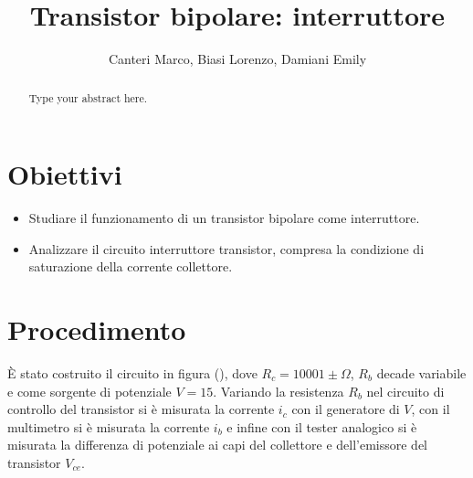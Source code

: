 \documentclass[letterpaper,11pt]{article}
\title{\textbf{Transistor bipolare:} interruttore}
\author{Canteri Marco, Biasi Lorenzo, Damiani Emily}
\date{}  %
\begin{document}
\maketitle

\begin{abstract}
Type your abstract here.
\end{abstract}

\begin{body}
\section{Obiettivi}
\begin{itemize}
\item Studiare il funzionamento di un transistor bipolare come interruttore.
\item Analizzare il circuito interruttore transistor, compresa la condizione di saturazione della
corrente collettore.
\end{itemize}
\section{Procedimento}
È stato costruito il circuito in figura (), dove $R_c = 10001 \pm \Omega$, $R_b$ decade variabile e come sorgente di potenziale $V=15$. Variando la resistenza $R_b$ nel circuito di controllo del transistor si è misurata la corrente $i_c$ con il generatore di $V$, con il multimetro si è misurata la corrente $i_b$ e infine con il tester analogico si è misurata la differenza di potenziale ai capi del collettore e dell'emissore del transistor $V_{ce}$.
\end{body}
\end{document}
